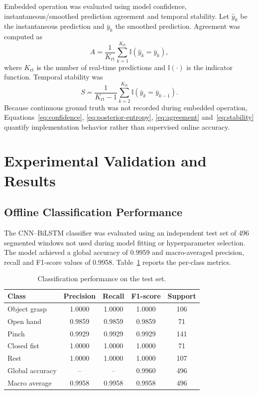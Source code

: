 \documentclass[technologies,article,submit,pdftex,moreauthors]{Definitions/mdpi}
\begin{document}
Embedded operation was evaluated using model confidence, instantaneous/smoothed prediction agreement and temporal stability. Let $\hat{y}_k$ be the instantaneous prediction and $\bar{y}_k$ the smoothed prediction. Agreement was computed as
\begin{equation}
    \label{eq:agreement}
    A =
    \frac{1}{K_{\mathrm{rt}}}
    \sum_{k=1}^{K_{\mathrm{rt}}}
    \mathbb{I}\left(\hat{y}_k=\bar{y}_k\right),
\end{equation}
where $K_{\mathrm{rt}}$ is the number of real-time predictions and $\mathbb{I}(\cdot)$ is the indicator function. Temporal stability was
\begin{equation}
    \label{eq:stability}
    S =
    \frac{1}{K_{\mathrm{rt}}-1}
    \sum_{k=2}^{K_{\mathrm{rt}}}
    \mathbb{I}\left(\bar{y}_k=\bar{y}_{k-1}\right).
\end{equation}
Because continuous ground truth was not recorded during embedded operation, Equations~\eqref{eq:confidence}, \eqref{eq:posterior-entropy}, \eqref{eq:agreement} and~\eqref{eq:stability} quantify implementation behavior rather than supervised online accuracy.

\section{Experimental Validation and Results}

\subsection{Offline Classification Performance}

The CNN--BiLSTM classifier was evaluated using an independent test set of 496 segmented windows not used during model fitting or hyperparameter selection. The model achieved a global accuracy of 0.9959 and macro-averaged precision, recall and F1-score values of 0.9958. Table~\ref{tab:classification} reports the per-class metrics.

\begin{table}[H]
\centering
\caption{Classification performance on the test set.\label{tab:classification}}
\begin{tabular}{lcccc}
\toprule
\textbf{Class} & \textbf{Precision} & \textbf{Recall} & \textbf{F1-score} & \textbf{Support} \\
\midrule
Object grasp & 1.0000 & 1.0000 & 1.0000 & 106 \\
Open hand & 0.9859 & 0.9859 & 0.9859 & 71 \\
Pinch & 0.9929 & 0.9929 & 0.9929 & 141 \\
Closed fist & 1.0000 & 1.0000 & 1.0000 & 71 \\
Rest & 1.0000 & 1.0000 & 1.0000 & 107 \\
\midrule
Global accuracy & -- & -- & 0.9960 & 496 \\
Macro average & 0.9958 & 0.9958 & 0.9958 & 496 \\
\bottomrule
\end{tabular}
\end{table}
\end{document}
